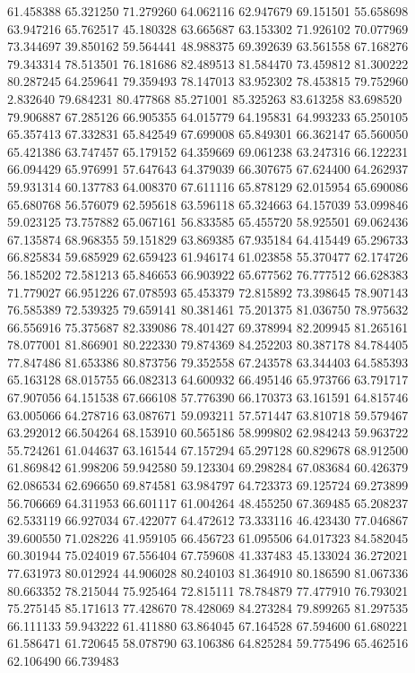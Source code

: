 61.458388
65.321250
71.279260
64.062116
62.947679
69.151501
55.658698
63.947216
65.762517
45.180328
63.665687
63.153302
71.926102
70.077969
73.344697
39.850162
59.564441
48.988375
69.392639
63.561558
67.168276
79.343314
78.513501
76.181686
82.489513
81.584470
73.459812
81.300222
80.287245
64.259641
79.359493
78.147013
83.952302
78.453815
79.752960
2.832640
79.684231
80.477868
85.271001
85.325263
83.613258
83.698520
79.906887
67.285126
66.905355
64.015779
64.195831
64.993233
65.250105
65.357413
67.332831
65.842549
67.699008
65.849301
66.362147
65.560050
65.421386
63.747457
65.179152
64.359669
69.061238
63.247316
66.122231
66.094429
65.976991
57.647643
64.379039
66.307675
67.624400
64.262937
59.931314
60.137783
64.008370
67.611116
65.878129
62.015954
65.690086
65.680768
56.576079
62.595618
63.596118
65.324663
64.157039
53.099846
59.023125
73.757882
65.067161
56.833585
65.455720
58.925501
69.062436
67.135874
68.968355
59.151829
63.869385
67.935184
64.415449
65.296733
66.825834
59.685929
62.659423
61.946174
61.023858
55.370477
62.174726
56.185202
72.581213
65.846653
66.903922
65.677562
76.777512
66.628383
71.779027
66.951226
67.078593
65.453379
72.815892
73.398645
78.907143
76.585389
72.539325
79.659141
80.381461
75.201375
81.036750
78.975632
66.556916
75.375687
82.339086
78.401427
69.378994
82.209945
81.265161
78.077001
81.866901
80.222330
79.874369
84.252203
80.387178
84.784405
77.847486
81.653386
80.873756
79.352558
67.243578
63.344403
64.585393
65.163128
68.015755
66.082313
64.600932
66.495146
65.973766
63.791717
67.907056
64.151538
67.666108
57.776390
66.170373
63.161591
64.815746
63.005066
64.278716
63.087671
59.093211
57.571447
63.810718
59.579467
63.292012
66.504264
68.153910
60.565186
58.999802
62.984243
59.963722
55.724261
61.044637
63.161544
67.157294
65.297128
60.829678
68.912500
61.869842
61.998206
59.942580
59.123304
69.298284
67.083684
60.426379
62.086534
62.696650
69.874581
63.984797
64.723373
69.125724
69.273899
56.706669
64.311953
66.601117
61.004264
48.455250
67.369485
65.208237
62.533119
66.927034
67.422077
64.472612
73.333116
46.423430
77.046867
39.600550
71.028226
41.959105
66.456723
61.095506
64.017323
84.582045
60.301944
75.024019
67.556404
67.759608
41.337483
45.133024
36.272021
77.631973
80.012924
44.906028
80.240103
81.364910
80.186590
81.067336
80.663352
78.215044
75.925464
72.815111
78.784879
77.477910
76.793021
75.275145
85.171613
77.428670
78.428069
84.273284
79.899265
81.297535
66.111133
59.943222
61.411880
63.864045
67.164528
67.594600
61.680221
61.586471
61.720645
58.078790
63.106386
64.825284
59.775496
65.462516
62.106490
66.739483
